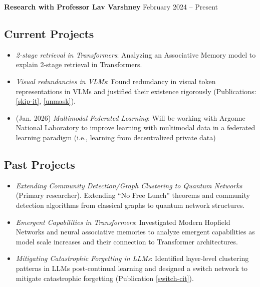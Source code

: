 \documentclass[letterpaper,10pt]{article}
\begin{document}
\textbf{Research with Professor Lav Varshney} \hfill February 2024 -- Present\vspace{-10pt}
\subsection{Current Projects}
\begin{itemize}[itemsep=-5pt, parsep=5pt, leftmargin=0.25in]
    \item \textit{2-stage retrieval in Transformers}: Analyzing an Associative Memory model to explain 2-stage retrieval in Transformers.
    \item \textit{Visual redundancies in VLMs}: Found redundancy in visual token representations in VLMs and justified their existence rigorously (Publications: \ref{skip-it}, \ref{unmask}).
    \item (Jan. 2026) \textit{Multimodal Federated Learning}: Will be working with Argonne National Laboratory to improve learning with multimodal data in a federated learning paradigm (i.e., learning from decentralized private data)
\end{itemize}\vspace{-10pt}
\subsection{Past Projects}
\begin{itemize}[itemsep=-5pt, parsep=5pt, leftmargin=0.25in]
    \item \textit{Extending Community Detection/Graph Clustering to Quantum Networks} (Primary researcher). Extending “No Free Lunch” theorems and community detection algorithms from classical graphs to quantum network structures.
    \item \textit{Emergent Capabilities in Transformers}: Investigated Modern Hopfield Networks and neural associative memories to analyze emergent capabilities as model scale increases and their connection to Transformer architectures.
    \item \textit{Mitigating Catastrophic Forgetting in LLMs}: Identified layer-level clustering patterns in LLMs post-continual learning and designed a switch network to mitigate catastrophic 
    forgetting (Publication \ref{switch-cit}).
\end{itemize}
\end{document}
